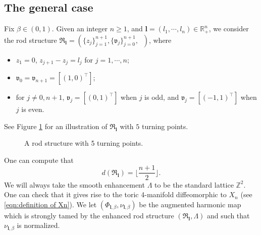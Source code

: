 \documentclass[a4paper,11pt]{amsart}
\theoremstyle{definition}
\numberwithin{equation}{section}
\newcommand{\bl}{\bm{l}}
\newcommand{\R}{\mathbb{R}}
\newcommand{\dZ}{\mathbb{Z}}
\newcommand{\mR} {\mathfrak R}
\DeclareMathOperator{\AFa}{AF_\beta}
\begin{document}
  

\subsection{The general case}\label{ss:general case}

Fix $\beta\in (0, 1)$. Given an integer $n\geq 1$, and $\bl=(l_1, \cdots, l_n)\in \R^n_+$,  we consider the rod structure  $\mathfrak{R}_{\bl}=(\{z_j\}_{j=1}^{n+1},\{\mathfrak{v}_j\}_{j=0}^{n+1}, \AFa)$, where
\begin{itemize}
\item $z_1=0$, $z_{j+1}-z_{j}=l_j$ for $j=1, \cdots, n$;
    \item $\mathfrak{v}_0=\mathfrak{v}_{n+1}=[(1,0)^{\top}]$;
    \item for $j\neq0,n+1$, $\mathfrak{v}_{j}=[(0,1)^{\top}]$ when $j$ is odd, and $\mathfrak{v}_{j}=[(-1,1)^{\top}]$ when $j$ is even.
\end{itemize}
See Figure \ref{Figure:AF rod structure} for an illustration of $\mathfrak{R}_{\bl}$ with  $5$ turning points.
\begin{figure}[ht]
	\caption{A rod structure with 5 turning points.}
	 \label{Figure:AF rod structure}   
\end{figure}


One can compute that 
\begin{equation}\label{eqn:degree formula}
    d(\mathfrak{R}_{\bl})=\lfloor\frac{n+1}{2}\rfloor.
\end{equation}
We will always take the smooth enhancement $\Lambda$ to be the standard lattice $\dZ^2$. One can check that it gives rise to the  toric 4-manifold diffeomorphic to $X_{n}$ (see \eqref{eqn:definition of Xn}).  We let $(\Phi_{\bl, \beta}, \nu_{\bl, \beta})$ be the augmented harmonic map which is strongly tamed by the enhanced rod structure $(\mR_{\bl}, \Lambda)$ and such that $\nu_{\bl, \beta}$ is normalized. 
\end{document}
